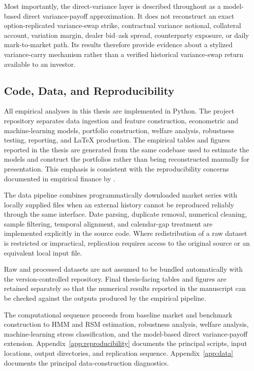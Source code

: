 Most importantly, the direct-variance layer is described throughout as a model-based direct variance-payoff approximation. It does not reconstruct an exact option-replicated variance-swap strike, contractual variance notional, collateral account, variation margin, dealer bid--ask spread, counterparty exposure, or daily mark-to-market path. Its results therefore provide evidence about a stylized variance-carry mechanism rather than a verified historical variance-swap return available to an investor.

\subsection{Code, Data, and Reproducibility}
\label{subsec:reproducibility}

All empirical analyses in this thesis are implemented in Python. The project repository separates data ingestion and feature construction, econometric and machine-learning models, portfolio construction, welfare analysis, robustness testing, reporting, and LaTeX production. The empirical tables and figures reported in the thesis are generated from the same codebase used to estimate the models and construct the portfolios rather than being reconstructed manually for presentation. This emphasis is consistent with the reproducibility concerns documented in empirical finance by \textcite{PerignonEtAl2024}.

The data pipeline combines programmatically downloaded market series with locally supplied files when an external history cannot be reproduced reliably through the same interface. Date parsing, duplicate removal, numerical cleaning, sample filtering, temporal alignment, and calendar-gap treatment are implemented explicitly in the source code. Where redistribution of a raw dataset is restricted or impractical, replication requires access to the original source or an equivalent local input file.

Raw and processed datasets are not assumed to be bundled automatically with the version-controlled repository. Final thesis-facing tables and figures are retained separately so that the numerical results reported in the manuscript can be checked against the outputs produced by the empirical pipeline.

The computational sequence proceeds from baseline market and benchmark construction to HMM and RSM estimation, robustness analysis, welfare analysis, machine-learning stress classification, and the model-based direct variance-payoff extension. Appendix~\ref{app:reproducibility} documents the principal scripts, input locations, output directories, and replication sequence. Appendix~\ref{app:data} documents the principal data-construction diagnostics.
